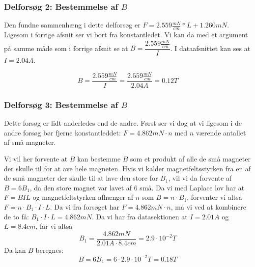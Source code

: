 \documentclass[10pt,a4paper]{article}
\theoremstyle{break}
\theoremstyle{nonumberplain}
\begin{document}
\subsubsection{Delforsøg 2: Bestemmelse af $B$}
Den fundne sammenhæng i dette delforsøg er $F = 2.559\frac{mN}{cm}*L + 1.260mN$.
Ligesom i forrige afsnit ser vi bort fra konstantledet.
Vi kan da med et argument på samme måde som i forrige afsnit se at $B=\dfrac{2.559\frac{mN}{cm}}{I}$. 
I dataafsnittet kan ses at $I=2.04A$.

$$B = \dfrac{2.559\frac{mN}{cm}}{I}  = \dfrac{2.559\frac{mN}{cm}}{2.04A} = 0.12T$$

\subsubsection{Delforsøg 3: Bestemmelse af $B$}
Dette forsøg er lidt anderledes end de andre.
Først ser vi dog at vi ligesom i de andre forsøg bør fjerne konstantleddet: $F = 4.862mN\cdot n$ med $n$ værende antallet af små magneter. 
 
Vi vil her forvente at $B$ kan bestemme $B$ som et produkt af alle de små magneter der skulle til for at ave hele magneten. 
Hvis vi kalder magnetfeltsstyrken fra en af de små magneter der skulle til at lave den store for $B_1$, vil vi da forvente af $B=6B_1$, da den store magnet var lavet af $6$ små.
Da vi med Laplace lov har at $F=BIL$ og magnetfeltstyrken afhænger af $n$ som $B=n\cdot B_1$, forventer vi altså $F=n\cdot B_1 \cdot I \cdot L$.
Da vi fra forsøget har $F=4.862mN\cdot n$, må vi ved at kombinere de to få: 
$B_1 \cdot I \cdot L = 4.862mN$.
Da vi har fra datasektionen at $I=2.01A$ og $L=8.4cm$, får vi altså 
$$B_1 = \dfrac{4.862mN}{2.01 A\cdot 8.4 cm}=2.9\cdot 10^{-2}T$$
Da kan $B$ beregnes:
$$B = 6 B_1 = 6\cdot 2.9\cdot 10^{-2}T=0.18T$$
\end{document}
